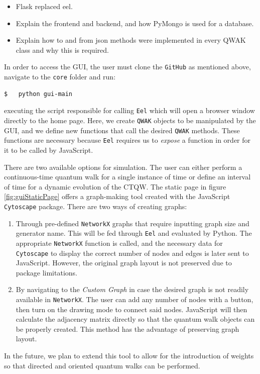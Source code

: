 \documentclass[main.tex]{subfiles}
\begin{document}
\begin{itemize}
    \item Flask replaced eel.
    \item Explain the frontend and backend, and how PyMongo is used for a
        database.
    \item Explain how to and from json methods were implemented in every QWAK
        class and why this is required.

\end{itemize}

In order to access the GUI, the user must clone the \texttt{GitHub} as
mentioned above, navigate to the \texttt{core} folder and run:
\begin{lstlisting}[style=commands]
$   python gui-main 
\end{lstlisting}

executing the script responsible for calling \texttt{Eel} which will open a
browser window directly to the home page. Here, we create \texttt{QWAK} objects
to be manipulated by the GUI, and we define new functions that call the desired
\texttt{QWAK} methods. These functions are necessary because \texttt{Eel}
requires us to \textit{expose} a function in order for it to be called by
JavaScript.\par 

There are two available options for simulation. The user can either perform a
continuous-time quantum walk for a single instance of time or define an
interval of time for a dynamic evolution of the CTQW. The static page in figure
\ref{fig:guiStaticPage} offers a graph-making tool created with the JavaScript
\texttt{Cytoscape} package. There are two ways of creating graphs:
\begin{enumerate}
    \item Through pre-defined \texttt{NetworkX} graphs that require inputting
        graph size and generator name. This will be fed through \texttt{Eel}
        and evaluated by Python. The appropriate \texttt{NetworkX} function is
        called, and the necessary data for \texttt{Cytoscape} to display the
        correct number of nodes and edges is later sent to JavaScript. However,
        the original graph layout is not preserved due to package limitations. 

    \item By navigating to the \textit{Custom Graph} in case the desired graph
        is not readily available in \texttt{NetworkX}. The user can add any
        number of nodes with a button, then turn on the drawing mode to connect
        said nodes. JavaScript will then calculate the adjacency matrix
        directly so that the quantum walk objects can be properly created. This
        method has the advantage of preserving graph layout.
\end{enumerate}
In the future, we plan to extend this tool to allow for the introduction of
weights so that directed and oriented quantum walks can be performed.\par
\end{document}
